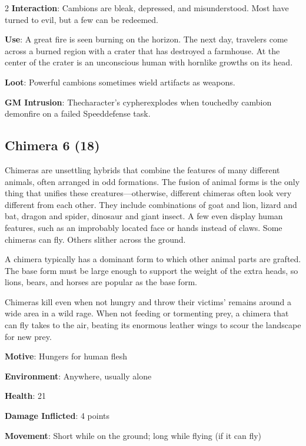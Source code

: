 \begin{multicols}{2}
\textbf{Interaction}: Cambions are bleak, depressed, and misunderstood. Most have turned to evil, but a few can be redeemed.

\textbf{Use}: A great fire is seen burning on the horizon. The next day, travelers come across a burned region with a crater that has destroyed a farmhouse. At the center of the crater is an unconscious human with hornlike growths on its head.

\textbf{Loot}: Powerful cambions sometimes wield artifacts as weapons.

\textbf{GM Intrusion}: Thecharacter’s cypherexplodes when touchedby cambion demonfire on a failed Speeddefense task.

\subsection{Chimera	6 (18)}

Chimeras are unsettling hybrids that combine the features of many different animals, often arranged in odd formations. The fusion of animal forms is the only thing that unifies these creatures—otherwise, different chimeras often look very different from each other. They include combinations of goat and lion, lizard and bat, dragon and spider, dinosaur and giant insect. A few even display human features, such as an improbably located face or hands instead of claws. Some chimeras can fly. Others slither across the ground. 

A chimera typically has a dominant form to which other animal parts are grafted. The base form must be large enough to support the weight of the extra heads, so lions, bears, and horses are popular as the base form.

Chimeras kill even when not hungry and throw their victims’ remains around a wide area in a wild rage. When not feeding or tormenting prey, a chimera that can fly takes to the air, beating its enormous leather wings to scour the landscape for new prey.

\textbf{Motive}: Hungers for human flesh

\textbf{Environment}: Anywhere, usually alone

\textbf{Health}: 21

\textbf{Damage Inflicted}: 4 points

\textbf{Movement}: Short while on the ground; long while flying (if it can fly)


\end{multicols}
